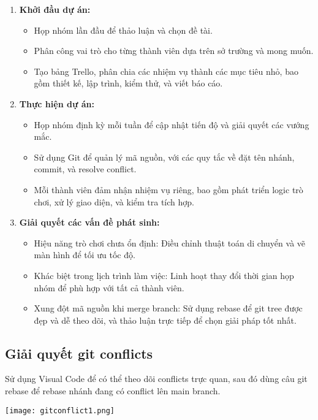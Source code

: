 \documentclass[a4paper, 12pt]{article}
\begin{document}
\begin{enumerate}
    \item \textbf{Khởi đầu dự án:}
    \begin{itemize}
        \item Họp nhóm lần đầu để thảo luận và chọn đề tài.
        \item Phân công vai trò cho từng thành viên dựa trên sở trường và mong muốn.
        \item Tạo bảng Trello, phân chia các nhiệm vụ thành các mục tiêu nhỏ, bao gồm thiết kế, lập trình, kiểm thử, và viết báo cáo.
    \end{itemize}
    
    \item \textbf{Thực hiện dự án:}
    \begin{itemize}
        \item Họp nhóm định kỳ mỗi tuần để cập nhật tiến độ và giải quyết các vướng mắc.
        \item Sử dụng Git để quản lý mã nguồn, với các quy tắc về đặt tên nhánh, commit, và resolve conflict.
        \item Mỗi thành viên đảm nhận nhiệm vụ riêng, bao gồm phát triển logic trò chơi, xử lý giao diện, và kiểm tra tích hợp.
    \end{itemize}
    
    \item \textbf{Giải quyết các vấn đề phát sinh:}
    \begin{itemize}
        \item Hiệu năng trò chơi chưa ổn định: Điều chỉnh thuật toán di chuyển và vẽ màn hình để tối ưu tốc độ.
        \item Khác biệt trong lịch trình làm việc: Linh hoạt thay đổi thời gian họp nhóm để phù hợp với tất cả thành viên.
        \item Xung đột mã nguồn khi merge branch: Sử dụng rebase để git tree được đẹp và dễ theo dõi, và thảo luận trực tiếp để chọn giải pháp tốt nhất.
    \end{itemize}
\end{enumerate}
\newpage

\subsection{Giải quyết git conflicts}
Sử dụng Visual Code để có thể theo dõi conflicts trực quan, sau đó dùng câu git rebase để rebase nhánh đang có conflict lên main branch.

\begin{center}
    \texttt{[image: gitconflict1.png]}
\end{center}
\end{document}
